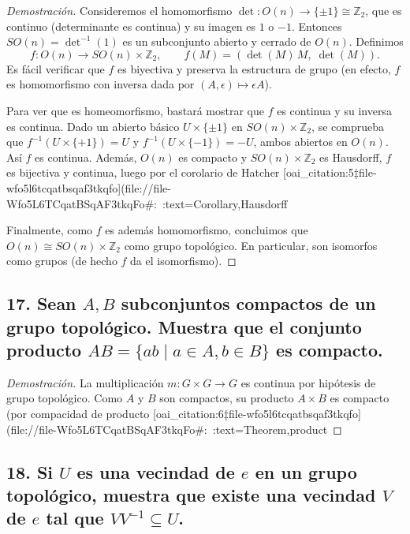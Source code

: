 \documentclass{article}
\begin{document}
\begin{proof}[Demostración]
Consideremos el homomorfismo $\det:O(n)\to\{\pm1\}\cong \mathbb{Z}_2$, que es continuo (determinante es continua) y su imagen es $1$ o $-1$. Entonces $SO(n)=\det^{-1}(1)$ es un subconjunto abierto y cerrado de $O(n)$. Definimos 
\[
f:O(n)\to SO(n)\times\mathbb{Z}_2,\qquad f(M)=(\det(M)\,M,\;\det(M)).
\] 
Es fácil verificar que $f$ es biyectiva y preserva la estructura de grupo (en efecto, $f$ es homomorfismo con inversa dada por $(A,\epsilon)\mapsto \epsilon A$). 

Para ver que es homeomorfismo, bastará mostrar que $f$ es continua y su inversa es continua. Dado un abierto básico $U\times\{\pm1\}$ en $SO(n)\times\mathbb{Z}_2$, se comprueba que $f^{-1}(U\times\{+1\})=U$ y $f^{-1}(U\times\{-1\})=-U$, ambos abiertos en $O(n)$. Así $f$ es continua. Además, $O(n)$ es compacto y $SO(n)\times\mathbb{Z}_2$ es Hausdorff, $f$ es bijectiva y continua, luego por el corolario de Hatcher [oai_citation:5‡file-wfo5l6tcqatbsqaf3tkqfo](file://file-Wfo5L6TCqatBSqAF3tkqFo#:~:text=Corollary,Hausdorff%

Finalmente, como $f$ es además homomorfismo, concluimos que $O(n)\cong SO(n)\times\mathbb{Z}_2$ como grupo topológico. En particular, son isomorfos como grupos (de hecho $f$ da el isomorfismo). 
\end{proof}

\subsection*{17. Sean $A,B$ subconjuntos compactos de un grupo topológico. Muestra que el conjunto producto $AB=\{ab\mid a\in A,b\in B\}$ es compacto.}

\begin{proof}[Demostración]
La multiplicación $m:G\times G\to G$ es continua por hipótesis de grupo topológico. Como $A$ y $B$ son compactos, su producto $A\times B$ es compacto (por compacidad de producto [oai_citation:6‡file-wfo5l6tcqatbsqaf3tkqfo](file://file-Wfo5L6TCqatBSqAF3tkqFo#:~:text=Theorem,product%
\end{proof}

\subsection*{18. Si $U$ es una vecindad de $e$ en un grupo topológico, muestra que existe una vecindad $V$ de $e$ tal que $VV^{-1}\subseteq U$.}
\end{document}
